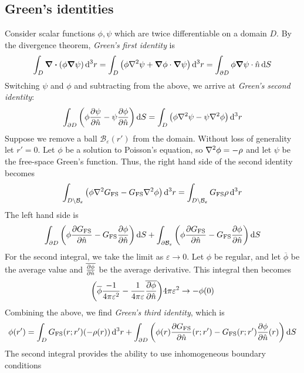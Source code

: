 \subsection{Green's identities}
Consider scalar functions \( \phi, \psi \) which are twice differentiable on a domain \( D \).
By the divergence theorem, \textit{Green's first identity} is
\[
	\int_D \div(\phi \grad{\psi}) \dd[3]{r} = \int_D \qty(\phi \laplacian{\psi} + \grad{\phi} \cdot \grad{\psi}) \dd[3]{r} = \int_{\partial D} \phi \grad{\psi} \cdot \hat n \dd{S}
\]
Switching \( \psi \) and \( \phi \) and subtracting from the above, we arrive at \textit{Green's second identity}:
\[
	\int_{\partial D} \qty(\phi \pdv{\psi}{\hat n} - \psi \pdv{\phi}{\hat n}) \dd{S} = \int_D \qty(\phi \laplacian{\psi} - \psi \laplacian{\phi}) \dd[3]{r}
\]
Suppose we remove a ball \( \mathcal B_\varepsilon(r') \) from the domain.
Without loss of generality let \( r' = 0 \).
Let \( \phi \) be a solution to Poisson's equation, so \( \laplacian{\phi} = -\rho \) and let \( \psi \) be the free-space Green's function.
Thus, the right hand side of the second identity becomes
\[
	\int_{D \setminus \mathcal B_\varepsilon} \qty(\phi \laplacian{G_{\mathrm{FS}}} - G_{\mathrm{FS}} \laplacian{\phi}) \dd[3]{r} = \int_{D \setminus \mathcal B_\varepsilon} G_{\mathrm{FS}} \rho \dd[3]{r}
\]
The left hand side is
\[
	\int_{\partial D} \qty(\phi \pdv{G_{\mathrm{FS}}}{\hat n} - G_{\mathrm{FS}} \pdv{\phi}{\hat n}) \dd{S} + \int_{\partial \mathcal B_\varepsilon} \qty(\phi \pdv{G_{\mathrm{FS}}}{\hat n} - G_{\mathrm{FS}} \pdv{\phi}{\hat n}) \dd{S}
\]
For the second integral, we take the limit as \( \varepsilon \to 0 \).
Let \( \phi \) be regular, and let \( \overline\phi \) be the average value and \( \overline{\pdv{\phi}{\hat n}} \) be the average derivative.
This integral then becomes
\[
	\qty(\overline\phi \frac{-1}{4 \pi \varepsilon^2} - \frac{1}{4 \pi \varepsilon} \overline{\pdv{\phi}{\hat n}}) 4 \pi \varepsilon^2 \to -\phi(0)
\]
Combining the above, we find \textit{Green's third identity}, which is
\[
	\phi(r') = \int_D G_{\mathrm{FS}}(r;r')  \qty(-\rho(r)) \dd[3]{r} + \int_{\partial D} \qty(\phi(r) \pdv{G_{\mathrm{FS}}}{\hat n} \qty(r;r') - G_{\mathrm{FS}}(r;r') \pdv{\phi}{\hat n}\qty(r)) \dd{S}
\]
The second integral provides the ability to use inhomogeneous boundary conditions

